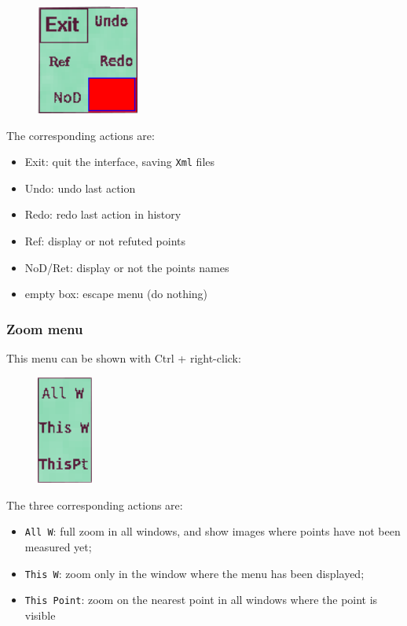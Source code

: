 \begin{figure}[H]
\begin{center}
\includegraphics[width=95pt]{FIGS/Saisie/contextual.png}
\end{center}
\label{FIG:contextual}
\end{figure}

The corresponding actions are:

\begin{itemize}
\item Exit: quit the interface, saving {\tt Xml} files
\item Undo: undo last action
\item Redo: redo last action in history
\item Ref: display or not refuted points
\item NoD/Ret: display or not the points names
\item empty box: escape menu (do nothing)
\end{itemize}

\subsubsection{Zoom menu}

This menu can be shown with Ctrl + right-click:

\begin{figure}[H]
\begin{center}
\includegraphics[width=52pt]{FIGS/Saisie/zoom.png}
\end{center}
\label{FIG:zoom}
\end{figure}

The three corresponding actions are:

\begin{itemize}
\item {\tt All W}: full zoom in all windows, and show images where points have not been measured yet;
\item {\tt This W}: zoom only in the window where the menu has been displayed;
\item {\tt This Point}: zoom on the nearest point in all windows where the point is visible
\end{itemize}


